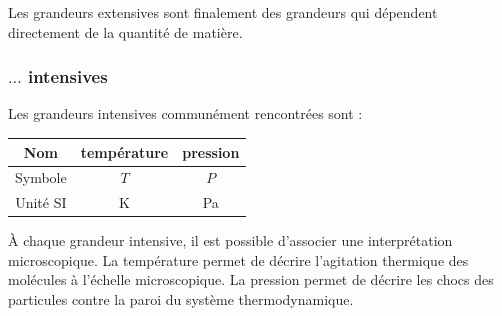 Les grandeurs extensives sont finalement des grandeurs qui dépendent directement de la quantité de matière.




\subsubsection{$\ldots$ intensives}

Les grandeurs intensives communément rencontrées sont :

\begin{minipage}{0.5\textwidth}
\centering
\begin{tabular}{ccc}
\toprule
Nom & température & pression \\
\midrule
Symbole & $T$ & $P$ \\
Unité SI & \si{\kelvin} & \si{\pascal} \\
\bottomrule
\end{tabular}
\end{minipage}\begin{minipage}{0.5\textwidth}
\end{minipage}

\`{A} chaque grandeur intensive, il est possible d'associer une interprétation microscopique. La température permet de décrire l'agitation thermique des molécules à l'échelle microscopique. La pression permet de décrire les chocs des particules contre la paroi du système thermodynamique. %

